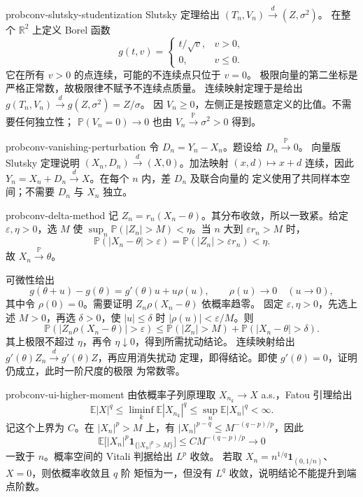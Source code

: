 \begin{solution}{probconv-slutsky-studentization}
Slutsky 定理给出 $(T_n,V_n)\xrightarrow d(Z,\sigma^2)$。
在整个 $\mathbb R^2$ 上定义 Borel 函数
\[
 g(t,v)=\begin{cases}t/\sqrt v,&v>0,\\0,&v\le0.\end{cases}
\]
它在所有 $v>0$ 的点连续，可能的不连续点只位于 $v=0$。
极限向量的第二坐标是严格正常数，故极限律不赋予不连续点质量。
连续映射定理于是给出
$g(T_n,V_n)\xrightarrow d g(Z,\sigma^2)=Z/\sigma$。
因 $V_n\ge0$，左侧正是按题意定义的比值。不需要任何独立性；
$\mathbb P(V_n=0)\to0$ 也由 $V_n\xrightarrow{\mathbb P}\sigma^2>0$ 得到。
\end{solution}

\begin{solution}{probconv-vanishing-perturbation}
令 $D_n=Y_n-X_n$。题设给 $D_n\xrightarrow{\mathbb P}0$。
向量版 Slutsky 定理说明
$(X_n,D_n)\xrightarrow d(X,0)$。加法映射
$(x,d)\mapsto x+d$ 连续，因此
$Y_n=X_n+D_n\xrightarrow dX$。在每个 $n$ 内，差 $D_n$ 及联合向量的
定义使用了共同样本空间；不需要 $D_n$ 与 $X_n$ 独立。
\end{solution}

\begin{solution}{probconv-delta-method}
记 $Z_n=r_n(X_n-\theta)$。其分布收敛，所以一致紧。给定
$\varepsilon,\eta>0$，选 $M$ 使
$\sup_n\mathbb P(|Z_n|>M)<\eta$。当 $n$ 大到 $\varepsilon r_n>M$ 时，
\[
 \mathbb P(|X_n-\theta|>\varepsilon)
 =\mathbb P(|Z_n|>\varepsilon r_n)<\eta.
\]
故 $X_n\xrightarrow{\mathbb P}\theta$。

可微性给出
\[
 g(\theta+u)-g(\theta)=g'(\theta)u+u\rho(u),
 \qquad\rho(u)\to0\quad(u\to0),
\]
其中令 $\rho(0)=0$。需要证明 $Z_n\rho(X_n-\theta)$ 依概率趋零。
固定 $\varepsilon,\eta>0$，先选上述 $M>0$，再选 $\delta>0$，使
$|u|\le\delta$ 时 $|\rho(u)|<\varepsilon/M$。则
\[
 \mathbb P(|Z_n\rho(X_n-\theta)|>\varepsilon)
 \le\mathbb P(|Z_n|>M)+\mathbb P(|X_n-\theta|>\delta).
\]
其上极限不超过 $\eta$，再令 $\eta\downarrow0$，得到所需扰动结论。
连续映射给出 $g'(\theta)Z_n\xrightarrow d g'(\theta)Z$，再应用消失扰动
定理，即得结论。即使 $g'(\theta)=0$，证明仍成立，此时一阶尺度的极限
为常数零。
\end{solution}

\begin{solution}{probconv-ui-higher-moment}
由依概率子列原理取 $X_{n_k}\to X$ a.s.，Fatou 引理给出
\[
 \mathbb E|X|^q\le\liminf_k\mathbb E|X_{n_k}|^q
 \le\sup_n\mathbb E|X_n|^q<\infty.
\]
记这个上界为 $C$。在 $|X_n|^p>M$ 上，有
$|X_n|^{p-q}\le M^{-(q-p)/p}$，因此
\[
 \mathbb E\bigl[|X_n|^p\mathbf1_{\{|X_n|^p>M\}}\bigr]
 \le C M^{-(q-p)/p}\longrightarrow0
\]
一致于 $n$。概率空间的 Vitali 判据给出 $L^p$ 收敛。
若取 $X_n=n^{1/q}\mathbf1_{(0,1/n)}$、$X=0$，则依概率收敛且 $q$ 阶
矩恒为一，但没有 $L^q$ 收敛，说明结论不能提升到端点阶数。
\end{solution}

